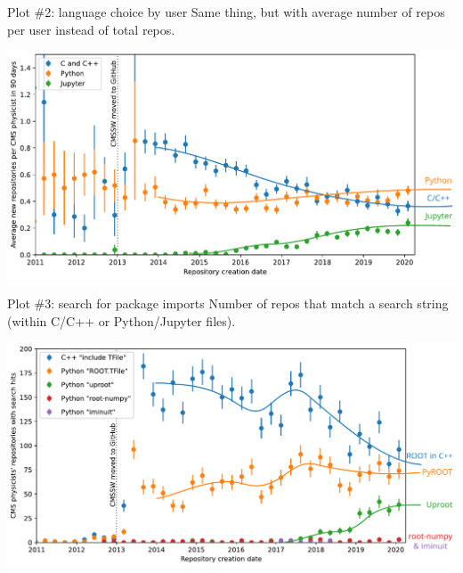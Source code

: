 \documentclass[aspectratio=169]{beamer}
\begin{document}
\begin{frame}{Plot \#2: language choice by user}
\vspace{0.25 cm}
Same thing, but with average number of repos per user instead of total repos.

\vspace{0.15 cm}
\includegraphics[width=\linewidth]{02-github-cmssw-language-byuser.pdf}
\end{frame}

\begin{frame}{Plot \#3: search for package imports}
\vspace{0.25 cm}
Number of repos that match a search string (within C/C++ or Python/Jupyter files).

\vspace{0.15 cm}
\includegraphics[width=\linewidth]{03-github-root-python.pdf}
\end{frame}
\end{document}
